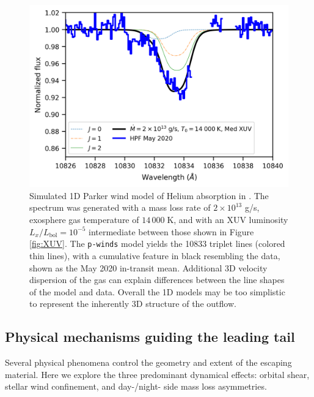 \documentclass[twocolumn]{aastex631}
\newcommand{\hatpb}{\object{HAT-P-67 b}}
\begin{document}
\begin{figure}
    \includegraphics[width=\linewidth]{figures/pwinds_May2020_14000_2e13Mdot_medXUV_formal_rv_rev.png}
    \caption{Simulated 1D Parker wind model of Helium absorption in \hatpb.  The spectrum was generated with a mass loss rate of $2\times10^{13}$ g/s, exosphere gas temperature of $14\,000\;$K, and with an XUV luminosity $L_x/L_\mathrm{bol}=10^{-5}$ intermediate between those shown in Figure \ref{fig:XUV}.  The \texttt{p-winds} model yields the  10833 triplet lines (colored thin lines), with a cumulative feature in black resembling the data, shown as the May 2020 in-transit mean.  Additional 3D velocity dispersion of the gas can explain differences between the line shapes of the model and data.  Overall the 1D models may be too simplistic to represent the inherently 3D structure of the outflow.}
    \label{fig:pwinds}
\end{figure}

\subsection{Physical mechanisms guiding the leading tail} \label{secLeading}
Several physical phenomena control the geometry and extent of the escaping material.  Here we explore the three predominant dynamical effects: orbital shear, stellar wind confinement, and day-/night- side mass loss asymmetries.
\end{document}

